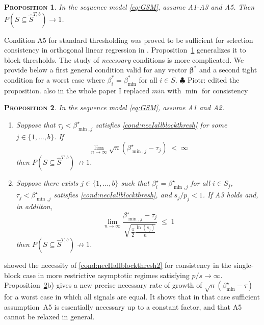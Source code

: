 \documentclass[aos]{imsart}
\theoremstyle{plain}
\newtheorem{prop}{\textsc{Proposition}}[section]
\newcommand{\piotr}[1]{{\small{\color{red} \sf $\clubsuit$ Piotr: #1}}}
\newcommand{\bs}{\boldsymbol}
\begin{document}
\begin{prop}\label{prop:suffnecIIblockthresh}
 In the sequence model \eqref{eq:GSM}, assume A1-A3 and A5. Then %
$P(S\subseteq \hat{S}^{T,b} ) \to 1$.
\end{prop}
Condition A5 for standard thresholding was proved to be sufficient for selection consistency in orthogonal linear regression in \cite{wainwrighthighdimbook}. Proposition~\ref{prop:suffnecIIblockthresh} generalizes it to block thresholds. The study of {\it necessary} conditions %
is more complicated. We provide below a first general condition valid for any vector $\bs \beta^*$ and a second tight condition for a worst case where $\beta_i^*=\beta_{\min}^*$ for all $i\in S$.
\piotr{edited the proposition. also in the whole paper I replaced $min$ with $\min$ for consistency}
\begin{prop}\label{prop:necIIblockthresh}In the %
sequence model \eqref{eq:GSM}, assume A1 and A2.
\begin{enumerate}
    \item [a)] Suppose that $\tau_j<\beta^\star_{\min,j}$ satisfies \eqref{cond:necIallblockthresh} for some $j \in \{1,\ldots,b\}$. If \begin{equation}\label{cond:necIIallblockthresh2}
    \lim_{n\to \infty} \sqrt{n}(\beta_{\min,j}^{\star}-\tau_j)\; <\; \infty
\end{equation}
then $P(S\subseteq \hat{S}^{T,b} ) \not \to 1$.
\item [b)] Suppose there exists $j\in \{1,\ldots,b\}$ such that  $\beta^{\star}_i=\beta_{\min,j}^{\star}$ for all $i \in S_j$, $\tau_j<\beta^\star_{\min,j}$ satisfies \eqref{cond:necIallblockthresh}, and  $s_j/p_j<1$. If A3 holds and, in addiiton, 
\begin{equation}\label{cond:necIIallblockthresh}
\lim_{n\to \infty} 	\frac{\beta_{\min,j}^{\star}-\tau_j}{\sqrt{\frac{\pi}{2}\frac{\ln(s_j)}{n}}} \;\leq\;  1\end{equation}
then $P(S\subseteq \hat{S}^{T,b} ) \not \to 1$.
\end{enumerate}\end{prop}
\cite{abraham2023sharp} showed the necessity of \eqref{cond:necIIallblockthresh2} for consistency in the single-block case %
in more restrictive asymptotic regimes satisfying $p/s \to \infty$. %
Proposition~\ref{prop:necIIblockthresh}b) gives a new precise necessary  rate of growth of $\sqrt{n}\left(\beta_{\min}^{\star}-\tau\right)$ for a worst case in which all signals are equal. It shows that in that case sufficient assumption~A5 is essentially necessary up to a constant factor, and that A5 cannot be relaxed in general.
\bigskip
\end{document}
